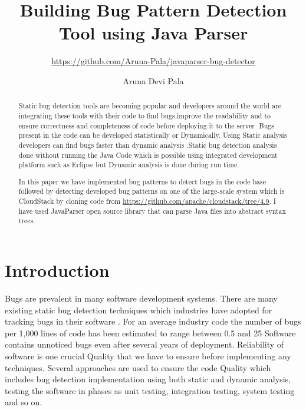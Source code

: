 \documentclass[sigplan,screen]{acmart}
\begin{document}
\title{Building Bug Pattern Detection Tool using Java Parser}
\subtitle{\url{https://github.com/Aruna-Pala/javaparser-bug-detector}}
\author{Aruna Devi Pala}


\begin{abstract}
  
  Static bug detection tools are becoming popular and developers around the world are integrating these tools with their code to find bugs,improve the readability and to ensure correctness and completeness of code before deploying it to the server \cite{ernst2003static}.Bugs present in the code can be developed statistically or Dynamically. Using Static analysis developers can find bugs faster than dynamic analysis \cite{truong2004static}.Static bug detection analysis done without running the Java Code which is possible using integrated development platform such as Eclipse but Dynamic analysis is done during run time.
  
  In this paper we have implemented bug patterns to detect bugs in the code base followed by detecting developed bug patterns on one of the large-scale system which is CloudStack by cloning code from \url{https://github.com/apache/cloudstack/tree/4.9}. I have used JavaParser \cite{hosseini2013javaparser} open source library that can parse Java files into abstract syntax trees.

\end{abstract}
\maketitle
\pagestyle{plain}

\section{Introduction}
Bugs are prevalent in many software development systems.
There are many existing static bug detection techniques which industries have adopted for tracking bugs in their software \cite{nam2019bug}. For an average industry code the number of bugs per 1,000 lines of code has been estimated to range between 0.5 and 25 \cite{mcconnell2006software} Software contains unnoticed bugs even after several years of deployment. Reliability of software is one crucial Quality that we have to ensure before implementing any techniques. Several approaches are used to ensure the code Quality which includes bug detection implementation using both static and dynamic analysis,
testing the software in phases as unit testing, integration testing, system testing and so on.
\end{document}
